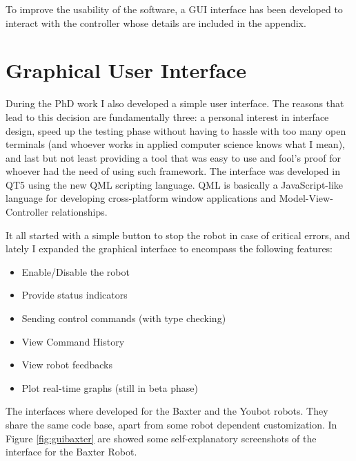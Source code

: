 To improve the usability of the software, a GUI interface has been developed to interact with the controller whose details are included in the appendix.  

\section{Graphical User Interface}\label{sec:gui}
During the PhD work I also developed a simple user interface. The reasons that lead to this decision are fundamentally three: a personal interest in interface design, speed up the testing phase without having to hassle with too many open terminals (and whoever works in applied computer science knows what I mean), and last but not least providing a tool that was easy to use and fool's proof for whoever had the need of using such framework. The interface was developed in QT5 using the new QML scripting language. QML is basically a JavaScript-like language for developing cross-platform window applications and Model-View-Controller relationships.

It all started with a simple  button to stop the robot in case of critical errors, and lately I expanded the graphical interface to encompass the following features:

\begin{itemize}
	\setlength\itemsep{-.3em}
	\item Enable/Disable the robot
	\item Provide status indicators
	\item Sending control commands (with type checking)
	\item View Command History
	\item View robot feedbacks
	\item Plot real-time graphs (still in beta phase)
\end{itemize}

The interfaces where developed for the Baxter and the Youbot robots. They share the same code base, apart from some robot dependent customization. In Figure \ref{fig:guibaxter} are showed some self-explanatory screenshots of the interface for the Baxter Robot.

